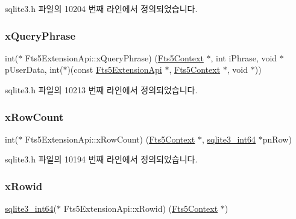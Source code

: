sqlite3.\+h 파일의 10204 번째 라인에서 정의되었습니다.

\mbox{\label{struct_fts5_extension_api_a8f6dcf0a1d246b235f98f5bbb214e28d}} 
\subsubsection{\texorpdfstring{x\+Query\+Phrase}{xQueryPhrase}}
{\footnotesize\ttfamily int($\ast$ Fts5\+Extension\+Api\+::x\+Query\+Phrase) (\hyperlink{sqlite3_8h_a97821b95ebebd43db901977ffd5b26bc}{Fts5\+Context} $\ast$, int i\+Phrase, void $\ast$p\+User\+Data, int($\ast$)(const \hyperlink{struct_fts5_extension_api}{Fts5\+Extension\+Api} $\ast$, \hyperlink{sqlite3_8h_a97821b95ebebd43db901977ffd5b26bc}{Fts5\+Context} $\ast$, void $\ast$))}



sqlite3.\+h 파일의 10213 번째 라인에서 정의되었습니다.

\mbox{\label{struct_fts5_extension_api_ae1eb7ad1d3c131a09376134ecc099568}} 
\subsubsection{\texorpdfstring{x\+Row\+Count}{xRowCount}}
{\footnotesize\ttfamily int($\ast$ Fts5\+Extension\+Api\+::x\+Row\+Count) (\hyperlink{sqlite3_8h_a97821b95ebebd43db901977ffd5b26bc}{Fts5\+Context} $\ast$, \hyperlink{sqlite3_8h_a0a4d3e6c1ad46f90e746b920ab6ca0d2}{sqlite3\+\_\+int64} $\ast$pn\+Row)}



sqlite3.\+h 파일의 10194 번째 라인에서 정의되었습니다.

\mbox{\label{struct_fts5_extension_api_acc4336c9f7bf39defa1acbdbf5df0020}} 
\subsubsection{\texorpdfstring{x\+Rowid}{xRowid}}
{\footnotesize\ttfamily \hyperlink{sqlite3_8h_a0a4d3e6c1ad46f90e746b920ab6ca0d2}{sqlite3\+\_\+int64}($\ast$ Fts5\+Extension\+Api\+::x\+Rowid) (\hyperlink{sqlite3_8h_a97821b95ebebd43db901977ffd5b26bc}{Fts5\+Context} $\ast$)}



